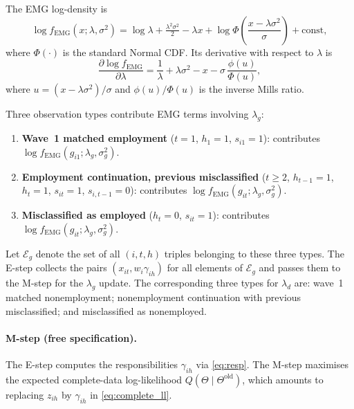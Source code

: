 \documentclass[12pt]{article}
\begin{document}
The EMG log-density is
\begin{equation}
\log f_{\mathrm{EMG}}(x; \lambda, \sigma^2) = \log \lambda + \tfrac{\lambda^2 \sigma^2}{2} - \lambda x + \log \Phi\!\left(\frac{x - \lambda\sigma^2}{\sigma}\right) + \mathrm{const},
\label{eq:log_emg}
\end{equation}
where \(\Phi(\cdot)\) is the standard Normal CDF. Its derivative with respect to \(\lambda\) is
\begin{equation}
\frac{\partial \log f_{\mathrm{EMG}}}{\partial \lambda} = \frac{1}{\lambda} + \lambda\sigma^2 - x - \sigma\,\frac{\phi(u)}{\Phi(u)},
\label{eq:demg_dlambda}
\end{equation}
where \(u = (x - \lambda\sigma^2)/\sigma\) and \(\phi(u)/\Phi(u)\) is the inverse Mills ratio.

Three observation types contribute EMG terms involving \(\lambda_g\):
\begin{enumerate}
\item \textbf{Wave~1 matched employment} (\(t=1\), \(h_1=1\), \(s_{i1}=1\)): contributes \(\log f_{\mathrm{EMG}}(g_{i1}; \lambda_g, \sigma_g^2)\).
\item \textbf{Employment continuation, previous misclassified} (\(t\ge 2\), \(h_{t-1}=1\), \(h_t=1\), \(s_{it}=1\), \(s_{i,t-1}=0\)): contributes \(\log f_{\mathrm{EMG}}(g_{it}; \lambda_g, \sigma_g^2)\).
\item \textbf{Misclassified as employed} (\(h_t=0\), \(s_{it}=1\)): contributes \(\log f_{\mathrm{EMG}}(g_{it}; \lambda_g, \sigma_g^2)\).
\end{enumerate}
Let \(\mathcal{E}_g\) denote the set of all \((i,t,h)\) triples belonging to these three types. The E-step collects the pairs \((x_{it}, w_i\gamma_{ih})\) for all elements of \(\mathcal{E}_g\) and passes them to the M-step for the \(\lambda_g\) update. The corresponding three types for \(\lambda_d\) are: wave~1 matched nonemployment; nonemployment continuation with previous misclassified; and misclassified as nonemployed.


\paragraph{M-step (free specification).}
The E-step computes the responsibilities \(\gamma_{ih}\) via \eqref{eq:resp}. The M-step maximises the expected complete-data log-likelihood \(Q(\Theta\mid\Theta^{\text{old}})\), which amounts to replacing \(z_{ih}\) by \(\gamma_{ih}\) in \eqref{eq:complete_ll}.
\end{document}

